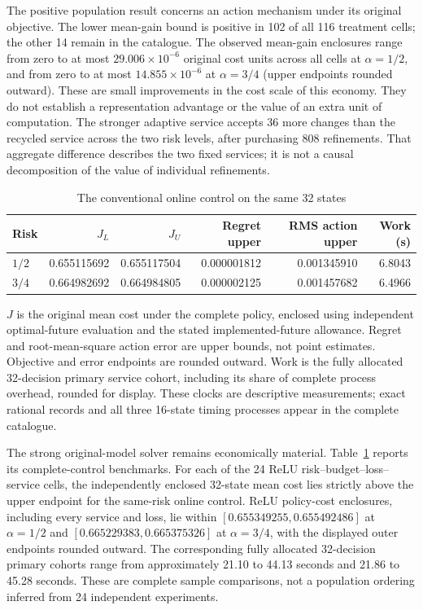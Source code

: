 The positive population result concerns an action mechanism under its
original objective. The lower mean-gain bound is positive in 102 of all
116 treatment cells; the other 14 remain in the catalogue. The observed
mean-gain enclosures range from zero to at most $29.006\times10^{-6}$
original cost units across all cells at $\alpha=1/2$, and from zero to at
most $14.855\times10^{-6}$ at $\alpha=3/4$ (upper endpoints rounded
outward). These are small improvements in the cost scale of this economy.
They do not establish a representation advantage or the value of an extra
unit of computation. The stronger adaptive service accepts 36 more changes
than the recycled service across the two risk levels, after purchasing 808
refinements. That aggregate difference describes the two fixed services;
it is not a causal decomposition of the value of individual refinements.

\begin{table}[t]
\centering
\caption{The conventional online control on the same 32 states}
\label{tab:onlinebenchmark122}
\begingroup\setlength{\tabcolsep}{4pt}\small
\begin{tabular}{lrrrrr}
\toprule
Risk & $J_L$ & $J_U$ & Regret upper & RMS action upper & Work (s)\\
\midrule
$1/2$ & 0.655115692 & 0.655117504 & 0.000001812 & 0.001345910 & 6.8043\\
$3/4$ & 0.664982692 & 0.664984805 & 0.000002125 & 0.001457682 & 6.4966\\
\bottomrule
\end{tabular}\endgroup
\par\smallskip
\begin{minipage}{0.98\linewidth}\footnotesize
$J$ is the original mean cost under the complete policy, enclosed using
independent optimal-future evaluation and the stated implemented-future
allowance. Regret and root-mean-square action error are upper bounds, not
point estimates. Objective and error endpoints are rounded outward.
Work is the fully allocated 32-decision primary service cohort, including
its share of complete process overhead, rounded for display. These clocks
are descriptive measurements; exact rational records and all three
16-state timing processes appear in the complete catalogue.
\end{minipage}
\end{table}

The strong original-model solver remains economically material.
Table~\ref{tab:onlinebenchmark122} reports its complete-control benchmarks.
For each of the 24 ReLU risk--budget--loss--service cells, the independently
enclosed 32-state mean cost lies strictly above the upper endpoint for the
same-risk online control. ReLU policy-cost enclosures, including every
service and loss, lie within $[0.655349255,0.655492486]$ at $\alpha=1/2$
and $[0.665229383,0.665375326]$ at $\alpha=3/4$, with the displayed
outer endpoints rounded outward. The corresponding fully allocated
32-decision primary cohorts range from approximately 21.10 to 44.13
seconds and 21.86 to 45.28 seconds. These are complete sample comparisons,
not a population ordering inferred from 24 independent experiments.

